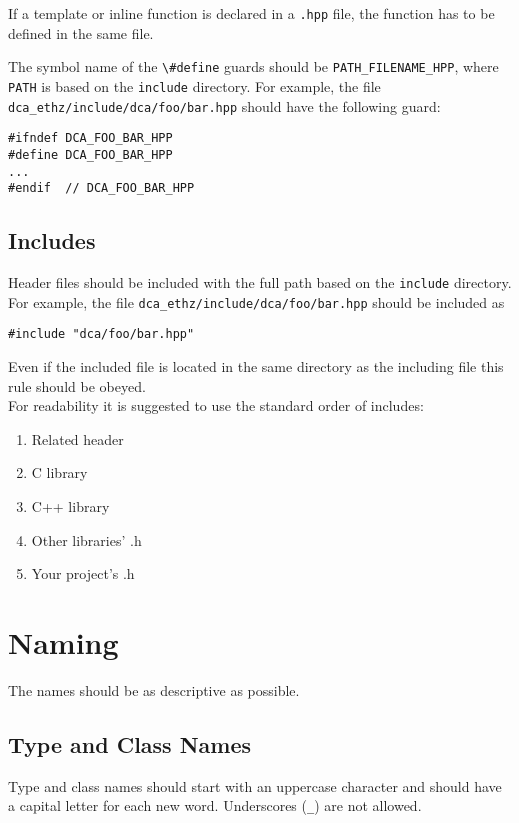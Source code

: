 \documentclass[a4paper]{article}
\newcommand{\inlinecode}[1]{\lstinline|#1|}
\begin{document}
If a template or inline function is declared in a \verb|.hpp| file, the function has to be defined in the same file.

The symbol name of the \inlinecode{\#define} guards should be \inlinecode{PATH_FILENAME_HPP}, where \inlinecode{PATH} is based on the \verb|include| directory. For example, the file\\ \verb|dca_ethz/include/dca/foo/bar.hpp| should have the following guard:

\begin{lstlisting}
#ifndef DCA_FOO_BAR_HPP
#define DCA_FOO_BAR_HPP
...
#endif  // DCA_FOO_BAR_HPP
\end{lstlisting}

\subsection{Includes}
Header files should be included with the full path based on the \verb|include| directory. For example, the file \verb|dca_ethz/include/dca/foo/bar.hpp| should be included as
\begin{lstlisting}
#include "dca/foo/bar.hpp"
\end{lstlisting}
Even if the included file is located in the same directory as the including file this rule should be obeyed. \\

For readability it is suggested to use the standard order of includes:
\begin{enumerate}
	\item Related header
	\item C library
	\item C++ library
	\item Other libraries' .h
	\item Your project's .h
\end{enumerate}
\section{Naming}

The names should be as descriptive as possible.

\subsection{Type and Class Names}

Type and class names should start with an uppercase character and should have a capital letter for each new word. Underscores (\inlinecode{_}) are not allowed.
\end{document}
